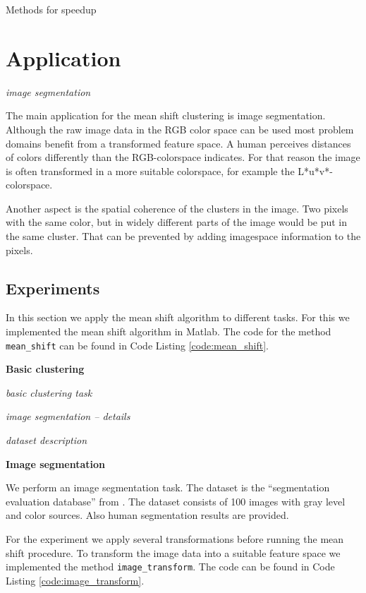 \documentclass{article}
\begin{document}
Methods for speedup

\section{Application} \label{sec:application}

\textit{image segmentation}

The main application for the mean shift clustering is image segmentation. Although the raw image data in the RGB color space can be used most problem domains benefit from a transformed feature space. A human perceives distances of colors differently than the RGB-colorspace indicates. For that reason the image is often transformed in a more suitable colorspace, for example the L*u*v*-colorspace.

Another aspect is the spatial coherence of the clusters in the image. Two pixels with the same color, but in widely different parts of the image would be put in the same cluster. That can be prevented by adding imagespace information to the pixels. 

\subsection{Experiments}

In this section we apply the mean shift algorithm to different tasks. For this we implemented the mean shift algorithm in Matlab. The code for the method \texttt{mean\_shift} can be found in Code Listing \ref{code:mean_shift}.

\textbf{Basic clustering}

\textit{basic clustering task}

\textit{image segmentation -- details}

\textit{dataset description}

\textbf{Image segmentation}

We perform an image segmentation task. The dataset is the ``segmentation evaluation database'' from \cite{Alpert.2012}. The dataset consists of 100 images with gray level and color sources. Also human segmentation results are provided.

For the experiment we apply several transformations before running the mean shift procedure. To transform the image data into a suitable feature space we implemented the method \texttt{image\_transform}. The code can be found in Code Listing \ref{code:image_transform}.
\end{document}
